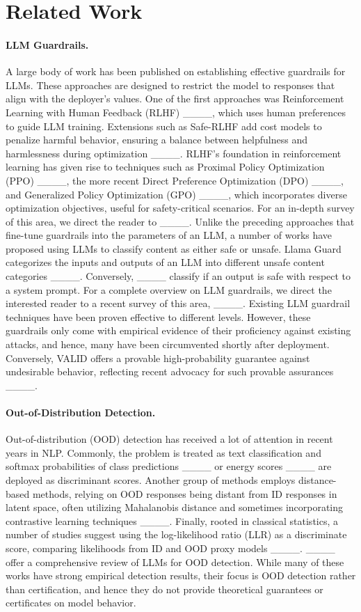 \section{Related Work}
\paragraph{LLM Guardrails.}
A large body of work has been published on establishing effective guardrails for LLMs. These approaches are designed to restrict the model to responses that align with the deployer's values. One of the first approaches was Reinforcement Learning with Human Feedback (RLHF) ____, which uses human preferences to guide LLM training.
Extensions such as Safe-RLHF add cost models to penalize harmful behavior, ensuring a balance between helpfulness and harmlessness during optimization ____.
RLHF's foundation in reinforcement learning has given rise to techniques such as Proximal Policy Optimization (PPO) ____, the more recent Direct Preference Optimization (DPO) ____,
and Generalized Policy Optimization (GPO) ____, which incorporates diverse optimization objectives, useful for safety-critical scenarios.
For an in-depth survey of this area, we direct the reader to ____.
Unlike the preceding approaches that fine-tune guardrails into the parameters of an LLM, a number of works have proposed using LLMs to classify content as either safe or unsafe.
Llama Guard categorizes the inputs and outputs of an LLM into different unsafe content categories ____. Conversely, ____ classify if an output is safe with respect to a system prompt.
For a complete overview on LLM guardrails, we direct the interested reader to a recent survey of this area, ____.
Existing LLM guardrail techniques have been proven effective to different levels. However, these guardrails only come with empirical evidence of their proficiency against existing attacks, and hence, many have been circumvented shortly after deployment. Conversely, VALID offers a provable high-probability guarantee against undesirable behavior, reflecting recent advocacy for such provable assurances ____.

\paragraph{Out-of-Distribution Detection. }
Out-of-distribution (OOD) detection has received a lot of attention in recent years in NLP. Commonly, the problem is treated as text classification and softmax probabilities of class predictions ____ or energy scores ____ are deployed as discriminant scores. Another group of methods employs distance-based methods, relying on OOD responses being distant from ID responses in latent space, often utilizing Mahalanobis distance and sometimes incorporating contrastive learning techniques ____. Finally, rooted in classical statistics, a number of studies suggest using the log-likelihood ratio (LLR) as a discriminate score, comparing likelihoods from ID and OOD proxy models ____. ____ offer a comprehensive review of LLMs for OOD detection. While many of these works have strong empirical detection results, their focus is OOD detection rather than certification, and hence they do not provide theoretical guarantees or certificates on model behavior.


